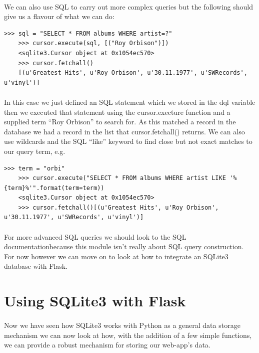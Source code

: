 \documentclass[12pt, a4paper, twoside]{book}
\begin{document}
\paragraph{} We can also use SQL to carry out more complex queries but the following should give us a flavour of what we can do:

\begin{lstlisting}[style=DOS]
    >>> sql = "SELECT * FROM albums WHERE artist=?"
    >>> cursor.execute(sql, [("Roy Orbison")])
    <sqlite3.Cursor object at 0x1054ec570>
    >>> cursor.fetchall()
    [(u'Greatest Hits', u'Roy Orbison', u'30.11.1977', u'SWRecords', u'vinyl')]
\end{lstlisting}

\paragraph{} In this case we just defined an SQL statement which we stored in the dql variable then we executed that statement using the cursor.execture function and a supplied term ``Roy Orbison'' to search for. As this matched a record in the database we had a record in the list that cursor.fetchall() returns. We can also use wildcards and the SQL ``like'' keyword to find close but not exact matches to our query term, e.g.

\begin{lstlisting}[style=DOS]
    >>> term = "orbi"
    >>> cursor.execute("SELECT * FROM albums WHERE artist LIKE '%{term}%'".format(term=term))
    <sqlite3.Cursor object at 0x1054ec570>
    >>> cursor.fetchall()[(u'Greatest Hits', u'Roy Orbison', u'30.11.1977', u'SWRecords', u'vinyl')]
\end{lstlisting}

\paragraph{} For more advanced SQL queries we should look to the SQL documentationbecause this module isn't really about SQL query construction. For now however we can move on to look at how to integrate an SQLite3 database with Flask.

\section{Using SQLite3 with Flask}
\label{sqlite3-flask}
\paragraph{} Now we have seen how SQLite3 works with Python as a general data storage mechanism we can now look at how, with the addition of a few simple functions, we can provide a robust mechanism for storing our web-app's data.
\end{document}
